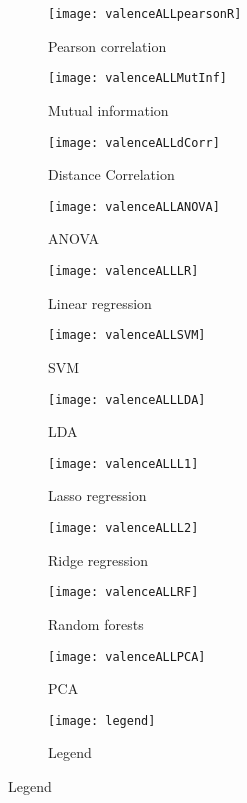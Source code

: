\clearpage

\begin{figure}[!tbp]
  \centering
  \caption{Selection features for valence classification.\label{valencepies}}
  \begin{subfigure}[b]{0.3\textwidth}
    \texttt{[image: valenceALLpearsonR]}
    \caption{Pearson correlation}
  \end{subfigure}
  \hfill
  \begin{subfigure}[b]{0.3\textwidth}
    \texttt{[image: valenceALLMutInf]}
    \caption{Mutual information}
  \end{subfigure}
  \hfill
  \begin{subfigure}[b]{0.3\textwidth}
    \texttt{[image: valenceALLdCorr]}
    \caption{Distance Correlation}
  \end{subfigure}
  
  \begin{subfigure}[b]{0.3\textwidth}
    \texttt{[image: valenceALLANOVA]}
    \caption{ANOVA}
  \end{subfigure}
  \hfill
  \begin{subfigure}[b]{0.3\textwidth}
    \texttt{[image: valenceALLLR]}
    \caption{Linear regression}
  \end{subfigure}
  \hfill
  \begin{subfigure}[b]{0.3\textwidth}
    \texttt{[image: valenceALLSVM]}
    \caption{SVM}
  \end{subfigure}
  
  \begin{subfigure}[b]{0.3\textwidth}
    \texttt{[image: valenceALLLDA]}
    \caption{LDA}
  \end{subfigure}
  \hfill
  \begin{subfigure}[b]{0.3\textwidth}
    \texttt{[image: valenceALLL1]}
    \caption{Lasso regression}
  \end{subfigure}
  \hfill
  \begin{subfigure}[b]{0.3\textwidth}
    \texttt{[image: valenceALLL2]}
    \caption{Ridge regression}
  \end{subfigure}
  
  \begin{subfigure}[b]{0.3\textwidth}
    \texttt{[image: valenceALLRF]}
    \caption{Random forests}
  \end{subfigure}
  \hfill
  \begin{subfigure}[b]{0.3\textwidth}
    \texttt{[image: valenceALLPCA]}
    \caption{PCA}
  \end{subfigure}
  \hfill
  \begin{subfigure}[b]{0.3\textwidth}
    \texttt{[image: legend]}
    \caption{Legend\label{valencepieslegend}}
  \end{subfigure}
\end{figure}
\clearpage

